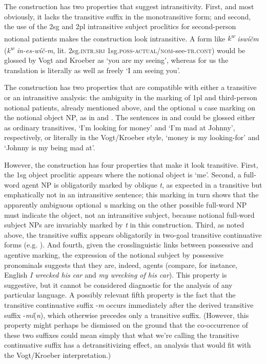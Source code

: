 \documentclass[output=paper,colorlinks,citecolor=brown]{langscibook}
\begin{document}
The construction has two properties that suggest intransitivity.
First, and most obviously, it lacks the transitive suffix in the
monotransitive form; and second, the use of the 2sg and 2pl
intransitive subject proclitics for second-person notional patients
makes the construction look intransitive.  A form like
\emph{{k\textsuperscript w} isw\'i\v{c}m} (\emph{{k\textsuperscript w}
in-es-w\'i\v{c}-m}, lit. 2sg.\textsc{intr.sbj} 1sg.\textsc{poss}-\textsc{actual/nom}-see-\textsc{tr.cont}) would be glossed by Vogt and
Kroeber as `you are my seeing', whereas for us the translation is
literally as well as freely `I am seeing you'.

The construction has two properties that are compatible with
either a transitive or an intransitive analysis: the ambiguity in the
marking of 1pl and third-person notional patients, already mentioned
above, and the optional \emph{{\textltilde}u} case marking on the notional
object NP, as in  and .  The sentences in  and  could be
glossed either as ordinary transitives, `I'm looking for money' and
`I'm mad at Johnny', respectively, or literally in the Vogt/Kroeber
style, `money is my looking-for' and `Johnny is my being mad at'.


However, the construction has four properties that make it look
transitive.  First, the 1sg object proclitic appears where the
notional object is `me'.  Second, a full-word agent NP is obligatorily
marked by oblique \emph{t}, as expected in a transitive but
emphatically not in an intransitive sentence; this marking in turn
shows that the apparently ambiguous optional \emph{{\textltilde}u}
marking on the other possible full-word NP must indicate the object,
not an intransitive subject, because notional full-word subject NPs
are invariably marked by \emph{t} in this construction.  Third, as
noted above, the transitive suffix appears obligatorily in two-goal
transitive continuative forms (e.g. ).  And fourth, given the
crosslinguistic links between possessive and agentive marking, the
expression of the notional subject by possessive pronominals suggests
that they are, indeed, agents (compare, for instance, English \emph{I
wrecked his car} and \emph{my wrecking of his car}).  This property is
suggestive, but it cannot be considered diagnostic for the analysis of
any particular language.  A possibly relevant fifth property is the
fact that the transitive continuative suffix -\emph{m} occurs
immediately after the derived transitive suffix
-\emph{m\'i}(\emph{n}), which otherwise precedes only a transitive
suffix.  (However, this property might perhaps be dismissed on the
ground that the co-occurrence of these two suffixes could mean simply
that what we're calling the transitive continuative suffix has a
detransitivizing effect, an analysis that would fit with the
Vogt/Kroeber interpretation.)
\end{document}
